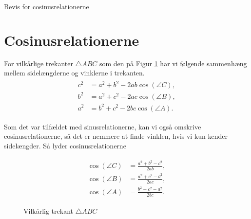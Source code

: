 


\begin{center}
\Huge
	Bevis for cosinusrelationerne
\end{center}

\section*{Cosinusrelationerne}

\begin{setn}[Cosinusrelationerne]
	\label{setn:cosinusrelationerne}
	For vilkårlige trekanter $\triangle ABC$ som den på Figur \ref{fig:vilkårlig} har vi følgende sammenhæng
	mellem sidelængderne og vinklerne i trekanten.
	\begin{align}
	\label{eq:cos1}
	\begin{split}
		c^2 &= a^2 + b^2 - 2ab\cos(\angle C),  \\
		b^2 &= a^2 + c^2 - 2ac\cos(\angle B), \\
		a^2 &= b^2 + c^2 - 2bc\cos(\angle A).
	\end{split}
	\end{align}
\end{setn}

Som det var tilfældet med sinusrelationerne, kan vi også omskrive cosinusrelationerne, så det er nemmere at finde vinklen, hvis vi kun kender sidelængder. Så lyder cosinusrelationerne

\begin{align}
	\label{eq:cos2}
	\begin{split}
	\cos(\angle C) &= \frac{a^2 + b^2 - c^2}{2ab},\\
	\cos(\angle B) &= \frac{a^2 + c^2 - b^2}{2ac},\\
	\cos(\angle A) &= \frac{b^2 + c^2 - a^2}{2bc}.
	\end{split}
\end{align}

\begin{figure}[H]
	\centering
	\caption{Vilkårlig trekant $\triangle ABC$}
	\label{fig:vilkårlig}
\end{figure}
\newpage

